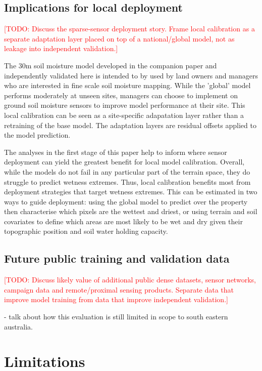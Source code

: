 \documentclass[11pt,a4paper]{article}
\newcommand{\todo}[1]{\textcolor{red}{[TODO: #1]}}
\begin{document}
\subsection{Implications for local deployment}
\label{sec:deployment}

\todo{Discuss the sparse-sensor deployment story.  Frame local calibration as a
separate adaptation layer placed on top of a national/global model, not as
leakage into independent validation.}

The 30m soil moisture model developed in the companion paper and independently validated 
here is intended to by used by land owners and managers who are 
interested in fine scale soil moisture mapping. While the 'global' model performs moderately
at unseen sites, managers can choose to implement on ground soil moisture sensors to improve
model performance at their site. This local calibration can be seen as a site-specific adapatation
layer rather than a retraining of the base model. The adaptation layers are residual offsets applied 
to the model prediction. 

The analyses in the first stage of this paper help to inform 
where sensor deployment can yield the greatest benefit for local model calibration. Overall, 
while the models do not fail in any particular part of the terrain space, they do struggle to predict
wetness extremes. Thus, local calibration benefits most from deployment strategies that target
wetness extremes. This can be estimated in two ways to guide deployment: using the global model
to predict over the property then characterise which pixels are the wettest and driest, or using 
terrain and soil covariates to define which areas are most likely to be wet and dry given their 
topographic position and soil water holding capacity. 


\subsection{Future public training and validation data}
\label{sec:future-data}

\todo{Discuss likely value of additional public dense datasets, sensor
networks, campaign data and remote/proximal sensing products.  Separate data
that improve model training from data that improve independent validation.}

- talk about how this evaluation is still limited in scope to south eastern australia. 


\section{Limitations}\label{sec:limitations}
\end{document}
